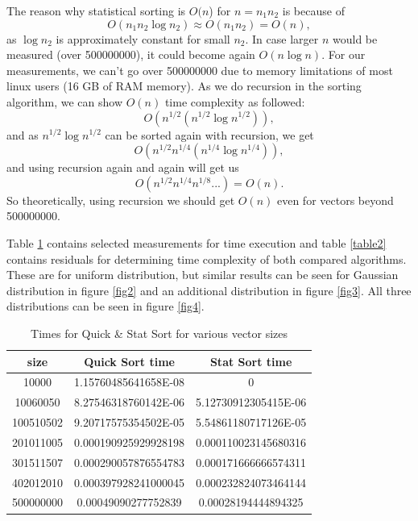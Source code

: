 \documentclass[12pt]{article}
\begin{document}
		The reason why statistical sorting is $O(n$) for $n = n_1 n_2$ is because of
		\[
		O(n_1 n_2 \log n_2) \approx O(n_1 n_2) = O(n),
		\]
		as $\log n_2$ is approximately constant for small $n_2$. In case larger $n$ would be measured (over 500000000), it could become again $O(n \log n)$. For our measurements, we can't go over 500000000 due to memory limitations of most linux users (16 GB of RAM memory). 
		As we do recursion in the sorting algorithm, we can show $O(n)$ time complexity as followed:
		\[
		O(n^{1/2} (n^{1/2} \log n^{1/2})),
		\]
		and as $n^{1/2} \log n^{1/2}$ can be sorted again with recursion, we get
		\[
		O(n^{1/2} n^{1/4} (n^{1/4} \log n^{1/4})),
		\]
		and using recursion again and again will get us
		\[
		O(n^{1/2} n^{1/4} n^{1/8} ...) = O(n).
		\]
		So theoretically, using recursion we should get $O(n)$ even for vectors beyond 500000000.
			
		Table \ref{table1} contains selected measurements for time execution and table \ref{table2} contains residuals for determining time complexity of both compared algorithms. These are for uniform distribution, but similar results can be seen for Gaussian distribution in figure \ref{fig2} and an additional distribution in figure \ref{fig3}. All three distributions can be seen in figure \ref{fig4}.
		
		\begin{table}
		\caption{Times for Quick \& Stat Sort for various vector sizes}
		\begin{center}
		\begin{tabular}{ |c|c|c| }
		
		\hline
		
		size & Quick Sort time & Stat Sort time \\

		\hline\hline		
		
		10000		& 1.15760485641658E-08	& 0 \\
		10060050		& 8.27546318760142E-06	& 5.12730912305415E-06 \\
		100510502	& 9.20717575354502E-05	& 5.54861180717126E-05 \\
		201011005	& 0.000190925929928198	& 0.000110023145680316 \\
		301511507	& 0.000290057876554783	& 0.000171666666574311 \\
		402012010	& 0.000397928241000045	& 0.000232824073464144 \\
		500000000	& 0.00049090277752839	& 0.00028194444894325 \\

		\hline
		\end{tabular}
		\end{center}
		\label{table1}
		\end{table}
\end{document}
